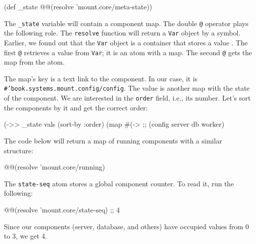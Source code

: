 \else

\begin{english}
  \begin{clojure}
(def _state @@(resolve 'mount.core/meta-state))
  \end{clojure}
\end{english}

\fi


The \verb|_state| variable will contain a component map. The double \verb|@| operator plays the following role. The \verb|resolve| function will return a \verb|Var| object by a symbol. Earlier, we found out that the \verb|Var| object is a container that stores a value . The first \verb|@| retrieves a value from \verb|Var|; it is an atom with a map. The second \verb|@| gets the map from the atom.


The map's key is a text link to the component. In our case, it is \texttt{\#'book.systems.mount\-.config/config}. The value is another map with the state of the component. We are interested in the \verb|order| field, i.e., its number. Let's sort the components by it and get the correct order:

\begin{english}
  \begin{clojure}
(->> _state
     vals
     (sort-by :order)
     (map #(-> %
;; (config server db worker)
  \end{clojure}
\end{english}

The code below will return a map of running components with a similar structure:

\begin{english}
  \begin{clojure}
@@(resolve 'mount.core/running)
  \end{clojure}
\end{english}

The \verb|state-seq| atom stores a global component counter. To read it, run the following:

\begin{english}
  \begin{clojure}
@@(resolve 'mount.core/state-seq) ;; 4
  \end{clojure}
\end{english}

\noindent
Since our components (server, database, and others) have occupied values from 0 to 3, we get 4.

